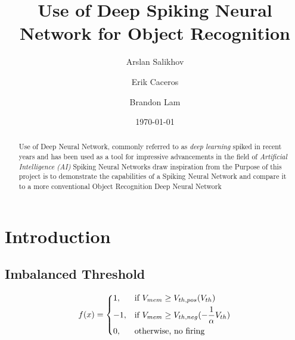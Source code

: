 \documentclass{article}
\title{Use of Deep Spiking Neural Network for Object Recognition}
\author{Arslan Salikhov  \\
	\and 
	Erik Caceros \\
	\and
	Brandon Lam \\
	}
\date{\today}
\begin{document}
\begin{titlingpage}
\maketitle
\end{titlingpage}


\begin{abstract}
Use of Deep Neural Network, commonly referred to as
\emph{deep learning} spiked in recent years and has been used
as a tool for impressive advancements in the field of 
\emph{Artificial Intelligence (AI)}
Spiking Neural Networks draw inspiration from the 
Purpose of this project is to demonstrate the capabilities of a 
Spiking Neural Network and compare it to a more conventional 
Object Recognition Deep Neural Network
\end{abstract}

\section{Introduction}



\subsection{Imbalanced Threshold} 
\[
    f(x)= 
\begin{dcases}
    1 ,& \text{if } {V_{mem}}\geq V_{th,pos}(V_{th})\\
	-1 ,& \text{if } {V_{mem}}\geq V_{th,neg}(-\frac{1}{\alpha}V_{th})\\
    0,              & \text{otherwise, no firing}
\end{dcases}
\]
\end{document}
